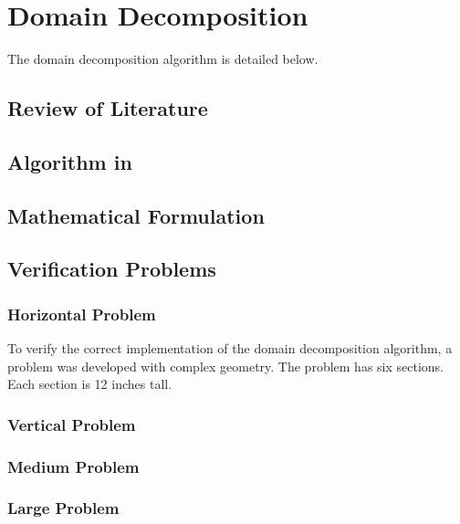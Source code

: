 \chapter{Domain Decomposition}
\label{chap:domain_decomposition}
The domain decomposition algorithm is detailed below.
\section{Review of Literature}
\label{sec:dd:review}

\section{Algorithm in \cobra{}}
\label{sec:dd:algo}

\section{Mathematical Formulation}
\label{sec:dd:math}

\section{Verification Problems}
\label{sec:dd:verify}

\subsection{Horizontal Problem}
\label{ss:dd:ver:horizontal}
To verify the correct implementation of the domain decomposition algorithm, a problem was developed with complex geometry.
The problem has six sections.
Each section is 12 inches tall.


\subsection{Vertical Problem}
\label{ss:dd:ver:vertical}


\subsection{Medium Problem}
\label{ss:dd:ver:medium}

\subsection{Large Problem}
\label{ss:dd:ver:large}



